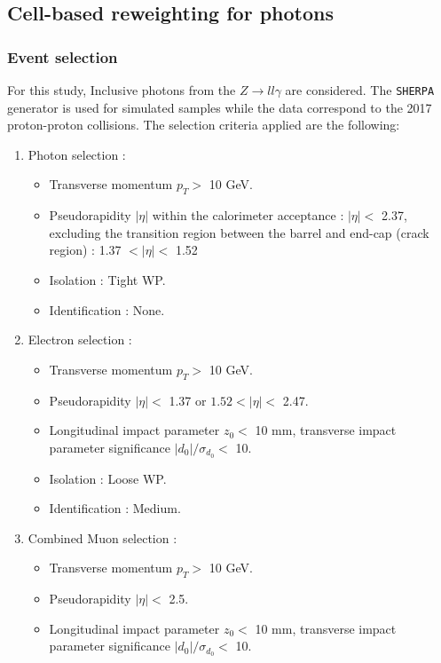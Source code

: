 \subsection{Cell-based reweighting for photons}
\label{gamma:ss:reweighting:photon}
\subsubsection{Event selection}
\label{gamma:ss:reweighting:photon:RadZSel}
For this study, Inclusive photons from the $Z\rightarrow ll\gamma$ are considered. The \verb|SHERPA| generator is used for simulated samples while the data correspond to the 2017 proton-proton collisions. The selection criteria applied are the following:
\begin{enumerate}
    \item Photon selection :  
    \begin{itemize}
    \item Transverse momentum $p_T > $  10 GeV.
    \item Pseudorapidity $|\eta|$ within the calorimeter acceptance : $|\eta| < $ 2.37, excluding the transition region between the barrel and end-cap (crack region) : 1.37 $ < |\eta| < $ 1.52
    \item Isolation : Tight WP.
    \item Identification : None. 
\end{itemize}
    \item Electron selection :
    \begin{itemize}
        \item Transverse momentum $p_T > $ 10 GeV.
        \item Pseudorapidity $|\eta| < $ 1.37 or $1.52 < |\eta| < $ 2.47.
        \item Longitudinal impact parameter $z_0 < $ 10 mm, transverse impact parameter significance $|d_0|/\sigma_{d_0} < $ 10.
        \item Isolation : Loose WP.
        \item Identification : Medium.
    \end{itemize}
    \item Combined Muon selection : 
    \begin{itemize}
        \item Transverse momentum $p_T > $ 10 GeV.
        \item Pseudorapidity $|\eta| < $ 2.5.
        \item Longitudinal impact parameter $z_0 < $ 10 mm, transverse impact parameter significance $|d_0|/\sigma_{d_0} < $ 10.

\end{itemize}
\end{enumerate}
